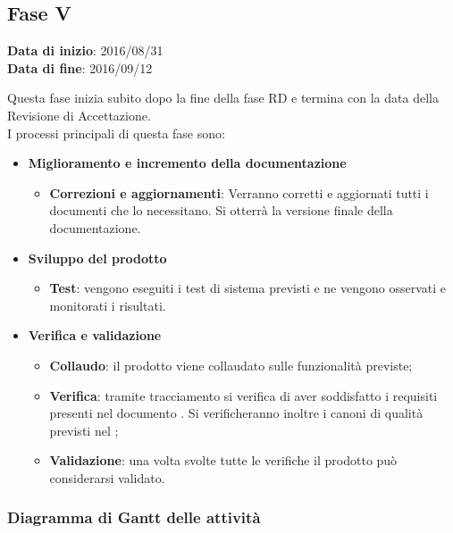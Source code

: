 	\subsection{Fase V}
	\begin{center}
		\textbf{Data di inizio}: 2016/08/31 \\
		\textbf{Data di fine}: 2016/09/12 \\
	\end{center}
	Questa fase inizia subito dopo la fine della fase RD e termina con la data della Revisione di Accettazione. \\
	I processi principali di questa fase sono:
		\begin{itemize}
			\item \textbf{Miglioramento e incremento della documentazione}
			\att
			\begin{itemize}
				\item \textbf{Correzioni e aggiornamenti}: Verranno corretti e aggiornati tutti i documenti che lo necessitano. Si otterrà la versione finale della documentazione. 
			\end{itemize}
			\item \textbf{Sviluppo del prodotto}
			\att
				\begin{itemize}
					\item \textbf{Test}: vengono eseguiti i test di sistema previsti e ne vengono osservati e monitorati i risultati. 
				\end{itemize}
			\item \textbf{Verifica e validazione}
			\att
			\begin{itemize}
				\item \textbf{Collaudo}: il prodotto viene collaudato sulle funzionalità previste;
				\item \textbf{Verifica}: tramite tracciamento si verifica di aver soddisfatto i requisiti presenti nel documento \ARdoc. Si verificheranno inoltre i canoni di qualità previsti nel \PQdoc;
				\item \textbf{Validazione}: una volta svolte tutte le verifiche il prodotto può considerarsi validato.
			\end{itemize}
		\end{itemize}
		\subsubsection{Diagramma di Gantt delle attività}
		
